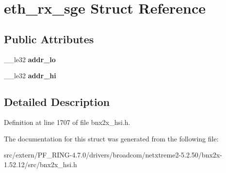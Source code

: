 \hypertarget{structeth__rx__sge}{
\section{eth\_\-rx\_\-sge Struct Reference}
\label{structeth__rx__sge}
}
\subsection*{Public Attributes}
\begin{DoxyCompactItemize}
\item 
\hypertarget{structeth__rx__sge_ab240570b2ded3f94a46d0394613365ae}{
\_\-\_\-le32 {\bfseries addr\_\-lo}}
\label{structeth__rx__sge_ab240570b2ded3f94a46d0394613365ae}

\item 
\hypertarget{structeth__rx__sge_ab67954d11a7d016fc08a6aa0796489c5}{
\_\-\_\-le32 {\bfseries addr\_\-hi}}
\label{structeth__rx__sge_ab67954d11a7d016fc08a6aa0796489c5}

\end{DoxyCompactItemize}


\subsection{Detailed Description}


Definition at line 1707 of file bnx2x\_\-hsi.h.



The documentation for this struct was generated from the following file:\begin{DoxyCompactItemize}
\item 
src/extern/PF\_\-RING-\/4.7.0/drivers/broadcom/netxtreme2-\/5.2.50/bnx2x-\/1.52.12/src/bnx2x\_\-hsi.h\end{DoxyCompactItemize}
